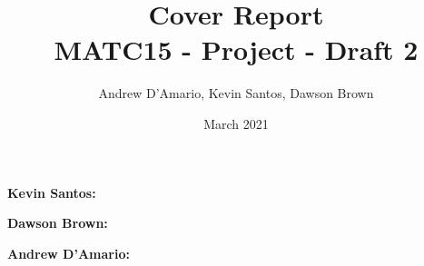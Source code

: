 \documentclass{article}
\title{Cover Report \\ \vspace{.3in} \large{MATC15 - Project - Draft 2}}
\author{Andrew D'Amario, Kevin Santos, Dawson Brown}
\date{March 2021}
\begin{document}
\maketitle

{\bf Kevin Santos: }

\vspace{.2in}

{\bf Dawson Brown: }

\vspace{.2in}

{\bf Andrew D'Amario: }
\end{document}

